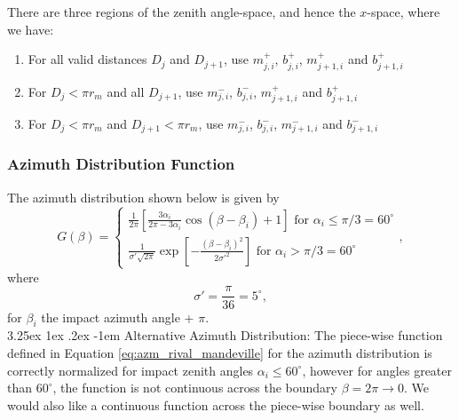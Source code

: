 \documentclass{hitec}
\makeatletter
\numberwithin{equation}{section}
\renewcommand\paragraph{\@startsection{paragraph}{5}{\z@}%
	{3.25ex \@plus1ex \@minus.2ex}%
	{-1em}%
	{\normalfont\normalsize\bfseries}}
\makeatother
\begin{document}
There are three regions of the zenith angle-space, and hence the $x$-space, where we have:
\begin{enumerate}[label=Region \Roman*:]
	\item For all valid distances $D_j$ and $D_{j+1}$, use $m_{j,i}^{+}$, $b_{j,i}^{+}$, $m_{j+1,i}^{+}$ and $b_{j+1,i}^{+}$
	\item For $D_j < \pi r_m$ and all $D_{j+1}$, use $m_{j,i}^{-}$, $b_{j,i}^{-}$, $m_{j+1,i}^{+}$ and $b_{j+1,i}^{+}$
	\item For $D_j < \pi r_m$ and $D_{j+1} < \pi r_m$, use $m_{j,i}^{-}$, $b_{j,i}^{-}$, $m_{j+1,i}^{-}$ and $b_{j+1,i}^{-}$
\end{enumerate}



\subsubsection{Azimuth Distribution Function}
\label{sssec:AzimuthDistributionFunction}

The azimuth distribution shown below is given by \citep{rival1999modeling}
\begin{equation}\label{eq:azm_rival_mandeville}
G(\beta) =
\begin{cases}
\frac{1}{2\pi}\left[\frac{3\alpha_i}{2\pi - 3\alpha_i}\cos(\beta-\beta_i)+1\right] \text{  for $\alpha_i\le \pi/3 = 60^\circ$}\\
\frac{1}{\sigma'\sqrt{2\pi}}\exp\left[-\frac{(\beta-\beta_i)^2}{2\sigma'^2}\right]
\text{  for $\alpha_i > \pi/3 = 60^\circ$}
\end{cases},
\end{equation}
where
\begin{equation}
\sigma' = \frac{\pi}{36} = 5^\circ, 
\end{equation}
for $\beta_i$ the impact azimuth angle + $\pi$.\\

\paragraph{Alternative Azimuth Distribution:}
The piece-wise function defined in Equation \eqref{eq:azm_rival_mandeville} for the azimuth distribution is correctly normalized for impact zenith angles $\alpha_i \le 60^\circ$, however for angles greater than $60^\circ$, the function is not continuous across the boundary $\beta = 2\pi \to 0$. We would also like a continuous function across the piece-wise boundary as well.
\end{document}
